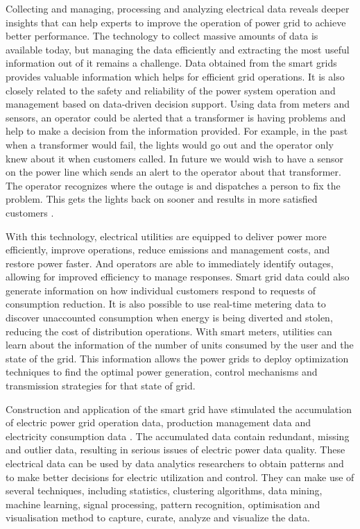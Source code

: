 Collecting and managing, processing and analyzing electrical data reveals deeper insights that can help experts to improve the operation of power grid to achieve better performance. The technology to collect massive amounts of data is available today, but managing the data efficiently and extracting the most useful information out of it remains a challenge. Data obtained from the smart grids provides valuable information which helps for efficient grid operations. It is also closely related to the safety and reliability of the power system operation and management based on data-driven decision support. Using data from meters and sensors, an operator could be alerted that a transformer is having problems and help to make a decision from the information provided. For example, in the past when a transformer would fail, the lights would go out and the operator only knew about it when customers called. In future we would wish to have a sensor on the power line which sends an alert to the operator about that transformer. The operator recognizes where the outage is and dispatches a person to fix the problem. This gets the lights back on sooner and results in more satisfied customers \cite{Troiano}. 

With this technology, electrical utilities are equipped to deliver power more efficiently, improve operations, reduce emissions and management costs, and restore power faster. And operators are able to immediately identify outages, allowing for improved efficiency to manage responses. Smart grid data could also generate information on how individual customers respond to requests of consumption reduction. It is also possible to use real-time metering data to discover unaccounted consumption when energy is being diverted and stolen, reducing the cost of distribution operations. With smart meters, utilities can learn about the information of the number of units consumed by the user and the state of the grid. This information allows the power grids to deploy optimization techniques to find the optimal power generation, control mechanisms and transmission strategies for that state of grid.

 Construction and application of the smart grid have stimulated the accumulation of electric power grid operation data, production management data and electricity consumption data \cite{chen2016data}. The accumulated data contain redundant, missing and outlier data, resulting in serious issues of electric power data quality.  These electrical data can be used by data analytics researchers to obtain patterns and to make better decisions for electric utilization and control. They can make use of several techniques, including statistics, clustering algorithms, data mining, machine learning, signal processing, pattern recognition, optimisation and visualisation method to capture, curate, analyze and visualize the data. 

